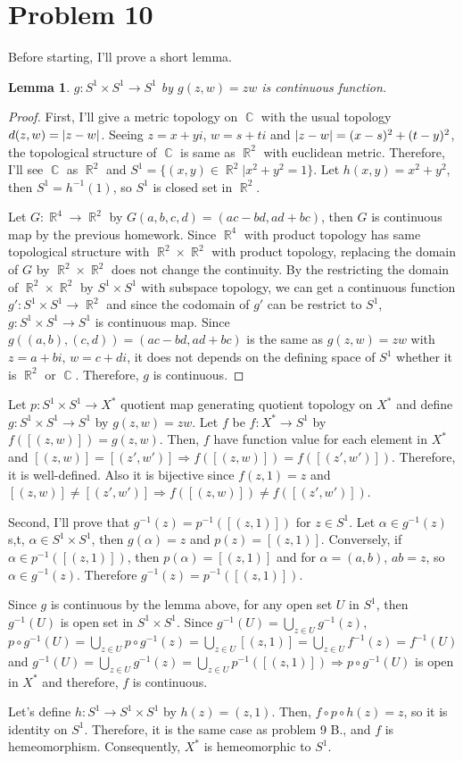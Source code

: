 \documentclass{article}
\DeclareMathOperator{\cc}{\mathbb{C}}
\DeclareMathOperator{\rr}{\mathbb{R}}
\DeclarePairedDelimiter\abs{\lvert}{\rvert}%
\newtheorem{lemma}{Lemma}
\begin{document}
\section*{Problem 10}
Before starting, I'll prove a short lemma.
\begin{lemma}
$g:S^1\times S^1\rightarrow S^1$ by $g(z,w)=zw$ is continuous function.
\end{lemma}
\begin{proof}
First, I'll give a metric topology on $\cc$ with the usual topology $d(z,w)=\abs{z-w}$. Seeing $z=x+yi$, $w=s+ti$ and $\abs{z-w}=(x-s)^2+(t-y)^2$, the topological structure of $\cc$ is same as $\rr^2$ with euclidean metric. Therefore, I'll see $\cc$ as $\rr^2$ and $S^1=\{(x,y)\in \rr^2|x^2+y^2=1\}$. Let $h(x,y)=x^2+y^2$, then $S^1=h^{-1}(1)$, so $S^1$ is closed set in $\rr^2$.

Let $G:\rr^4\rightarrow \rr^2$ by $G(a,b,c,d)=(ac-bd, ad+bc)$, then $G$ is continuous map by the previous homework. Since $\rr^4$ with product topology has same topological structure with $\rr^2\times \rr^2$ with product topology, replacing the domain of $G$ by $\rr^2\times\rr^2$ does not change the continuity. By the restricting the domain of $\rr^2\times \rr^2$ by $S^1\times S^1$ with subspace topology, we can get a continuous function $g':S^1\times S^1\rightarrow \rr^2$ and since the codomain of $g'$ can be restrict to $S^1$, $g:S^1\times S^1\rightarrow S^1$ is continuous map. Since $g((a,b),(c,d))=(ac-bd, ad+bc)$ is the same as $g(z,w)=zw$ with $z=a+bi$, $w=c+di$, it does not depends on the defining space of $S^1$ whether it is $\rr^2$ or $\cc$. Therefore, $g$ is continuous.
\end{proof}

Let $p:S^1\times S^1\rightarrow X^*$ quotient map generating quotient topology on $X^*$ and define $g:S^1\times S^1\rightarrow S^1$ by $g(z,w)=zw$. Let $f$ be $f:X^*\rightarrow S^1$ by $f([(z,w)])=g(z,w)$. Then, $f$ have function value for each element in $X^*$ and $[(z,w)]=[(z',w')]\Rightarrow f([(z,w)])=f([(z',w')])$. Therefore, it is well-defined. Also it is bijective since $f(z,1)=z$ and $[(z,w)]\neq[(z',w')]\Rightarrow  f([(z,w)])\neq f([(z',w')])$.

Second, I'll prove that $g^{-1}(z)=p^{-1}([(z,1)])$ for $z\in S^1$. Let $\alpha\in g^{-1}(z)$ s,t, $\alpha\in S^1\times S^1$, then $g(\alpha)=z$ and $p(z)=[(z,1)]$. Conversely, if $\alpha\in p^{-1}([(z,1)])$, then $p(\alpha)=[(z,1)]$ and for $\alpha=(a,b)$, $ab=z$, so $\alpha\in g^{-1}(z)$. Therefore $g^{-1}(z)=p^{-1}([(z,1)])$.

Since $g$ is continuous by the lemma above, for any open set $U$ in $S^1$, then $g^{-1}(U)$ is open set in $S^1\times S^1$. Since $g^{-1}(U)=\bigcup_{z\in U} g^{-1}(z)$, $p\circ g^{-1}(U)=\bigcup_{z\in U} p\circ g^{-1}(z)=\bigcup_{z\in U} [(z,1)]=\bigcup_{z\in U}f^{-1}(z)=f^{-1}(U)$ and $g^{-1}(U)=\bigcup_{z\in U}g^{-1}(z)=\bigcup_{z\in U}p^{-1}([(z,1)])\Rightarrow p\circ g^{-1}(U)$ is open in $X^*$ and therefore, $f$ is continuous.

Let's define $h:S^1\rightarrow S^1\times S^1$ by $h(z)=(z, 1)$. Then, $f\circ p\circ h(z)=z$, so it is identity on $S^1$. Therefore, it is the same case as problem 9 B., and $f$ is hemeomorphism. Consequently, $X^*$ is hemeomorphic to $S^1$.
\end{document}
